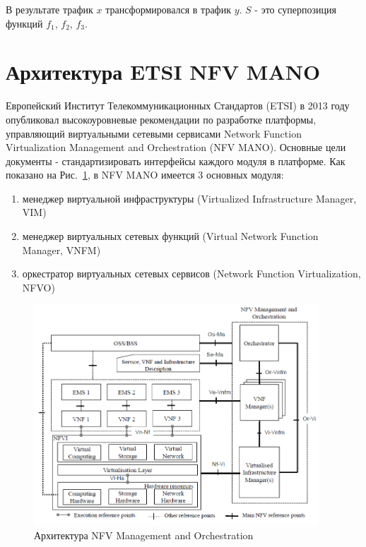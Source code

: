\documentclass[oneside,final,14pt,a4paper]{extreport}
\begin{document}
В результате трафик $x$ трансформировался в трафик $y$. $S$ - это суперпозиция функций $f_{1}$, $f_{2}$, $f_{3}$.


\section{Архитектура ETSI NFV MANO}
\label{sec:etsi_nfv_mano}
Европейский Институт Телекоммуникационных Стандартов (ETSI) в 2013 году опубликовал высокоуровневые рекомендации по разработке платформы, управляющий виртуальными сетевыми сервисами Network Function Virtualization Management and Orchestration (NFV MANO). Основные цели документы - стандартизировать интерфейсы каждого модуля в платформе.\cite{nfv-mano-state1} Как показано на Рис.~\ref{nfv-mano-image1}, в NFV MANO имеется 3 основных модуля:

\begin{enumerate}
	\item менеджер виртуальной инфраструктуры (Virtualized Infrastructure Manager, VIM)
	\item менеджер виртуальных сетевых функций (Virtual Network Function Manager, VNFM)
	\item оркестратор виртуальных сетевых сервисов (Network Function Virtualization, NFVO)
\end{enumerate}

\begin{figure}[h]
	\centering
	\includegraphics[width=0.95\textwidth]{nfv-mano}
	\caption{Архитектура NFV Management and Orchestration}
	\label{nfv-mano-image1}
\end{figure}
\end{document}
